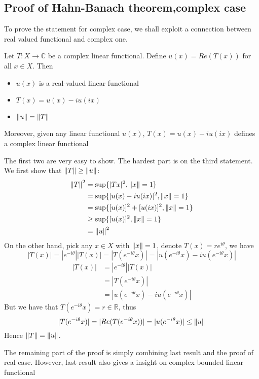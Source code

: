 \subsection{Proof of Hahn-Banach theorem,complex case}
To prove the statement for complex case, we shall exploit a connection between real valued functional and complex one.\\
\begin{proposition}\rm\nextline
	Let $T:X\xrightarrow{}\mathbb{C}$ be a complex linear functional. Define $u(x)=Re(T(x))$ for all $x\in X$. Then
	\begin{itemize}
		\item $u(x)$ is a real-valued linear functional
		\item $T(x)=u(x)-iu(ix)$
		\item $\left\|{u}\right\|=\left\|{T}\right\|$
	\end{itemize}
	Moreover, given any linear functional $u(x)$, $T(x)=u(x)-iu(ix)$ defines a complex linear functional
	\begin{pf}{}{}

	The first two are very easy to show. The hardest part is on the third statement. We first show that $\left\|{T}\right\|\geq\left\|{u}\right\|$:
	\begin{equation}
		\begin{split}
			\left\|{T}\right\|^2&=\sup\{|T x|^2,\left\|{x}\right\|=1\}\\
			&=\sup\{|u(x)-iu(ix)|^2,\left\|{x}\right\|=1\}\\
			&=\sup \{[u(x)]^2+[u(ix)]^2,\left\|{x}\right\|=1\}\\
			&\geq \sup \{[u(x)]^2,\left\|{x}\right\|=1\}\\
			&=\left\|{u}\right\|^2
		\end{split}
	\end{equation}
	On the other hand, pick any $x\in X$ with $\left\|{x}\right\|=1$, denote $T(x)=re^{i\theta}$, we have
	$$|T(x)|=|e^{-i\theta}||T(x)|=|T(e^{-i\theta}x)|=|u(e^{-i\theta}x)-iu(e^{-i\theta}x)|$$
	\begin{equation}
		\begin{split}
			|T(x)|&=|e^{-i\theta}||T(x)|\\
			&=|T(e^{-i\theta}x)|\\
			&=|u(e^{-i\theta}x)-iu(e^{-i\theta}x)|
		\end{split}
	\end{equation}
	But we have that $T(e^{-i\theta}x)=r\in\mathbb{R}$, thus
	$$
		|T(e^{-i\theta}x)|=|Re(T(e^{-i\theta}x))|=|u(e^{-i\theta}x)|\leq\left\|{u}\right\|
	$$
	Hence $\left\|{T}\right\|=\left\|{u}\right\|$.
\end{pf}
\end{proposition}
The remaining part of the proof is simply combining last result and the proof of real case. However, last result also gives a insight on complex bounded linear functional

